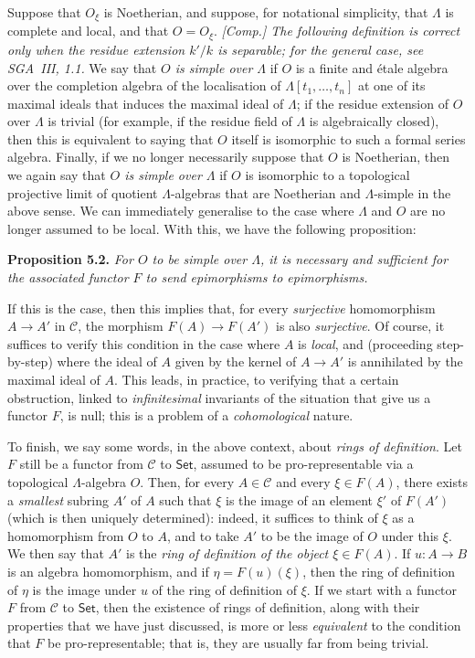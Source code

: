 \documentclass{article}
\newenvironment{itenv}[1]
  {\phantomsection\par\medskip\noindent\textbf{#1.}\itshape}
  {\medskip}
\renewcommand{\cal}[1]{{\mathcal{#1}}}
\newcommand{\Set}{\mathsf{Set}}
\newcommand{\oldpage}[1]{\marginpar{\footnotesize$\Big\vert$ \textit{p.~#1}}}
\begin{document}
Suppose that $O_\xi$ is Noetherian, and suppose, for notational simplicity, that $\Lambda$ is complete and local, and that $O=O_\xi$.
\emph{[Comp.] The following definition is correct only when the residue extension $k'/k$ is \emph{separable}; for the general case, see SGA~III, 1.1.}
We say that \emph{$O$ is simple over $\Lambda$} if $O$ is a finite and \'{e}tale algebra over the completion algebra of the localisation of $\Lambda[t_1,\ldots,t_n]$ at one of its maximal ideals that induces the maximal ideal of $\Lambda$;
if the residue extension of $O$ over $\Lambda$ is trivial (for example, if the residue field of $\Lambda$ is algebraically closed), then this is equivalent to saying that $O$ itself is isomorphic to such a formal series algebra.
Finally, if we no longer necessarily suppose that $O$ is Noetherian, then we again say that \emph{$O$ is simple over $\Lambda$} if $O$ is isomorphic to a topological projective limit of quotient $\Lambda$-algebras that are Noetherian and $\Lambda$-simple in the above sense.
We can immediately generalise to the case where $\Lambda$ and $O$ are no longer assumed to be local.
With this, we have the following proposition:

\begin{itenv}{Proposition 5.2}
\label{A.5-proposition2}
  For $O$ to be simple over $\Lambda$, it is necessary and sufficient for the associated functor $F$ to send epimorphisms to epimorphisms.
\end{itenv}

If this is the case, then this implies that, for every \emph{surjective} homomorphism $A\to A'$ in $\cal{C}$, the morphism $F(A)\to F(A')$ is also \emph{surjective}.
Of course, it suffices to verify this condition in the case where $A$ is \emph{local}, and (proceeding step-by-step) where the ideal of $A$ given by the kernel of $A\to A'$ is annihilated by the maximal ideal of $A$.
This leads, in practice, to verifying that a certain obstruction, linked to \emph{infinitesimal} invariants
\oldpage{195-09}
of the situation that give us a functor $F$, is null;
this is a problem of a \emph{cohomological} nature.

To finish, we say some words, in the above context, about \emph{rings of definition}.
Let $F$ still be a functor from $\cal{C}$ to $\Set$, assumed to be pro-representable via a topological $\Lambda$-algebra $O$.
Then, for every $A\in\cal{C}$ and every $\xi\in F(A)$, there exists a \emph{smallest} subring $A'$ of $A$ such that $\xi$ is the image of an element $\xi'$ of $F(A')$ (which is then uniquely determined):
indeed, it suffices to think of $\xi$ as a homomorphism from $O$ to $A$, and to take $A'$ to be the image of $O$ under this $\xi$.
We then say that $A'$ is the \emph{ring of definition of the object $\xi\in F(A)$}.
If $u\colon A\to B$ is an algebra homomorphism, and if $\eta=F(u)(\xi)$, then the ring of definition of $\eta$ is the image under $u$ of the ring of definition of $\xi$.
If we start with a functor $F$ from $\cal{C}$ to $\Set$, then the existence of rings of definition, along with their properties that we have just discussed, is more or less \emph{equivalent} to the condition that $F$ be pro-representable;
that is, they are usually far from being trivial.
\end{document}

